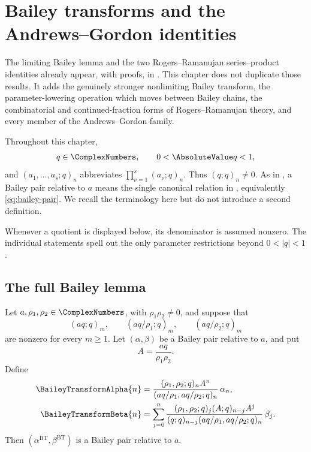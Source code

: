 \chapter{Bailey transforms and the Andrews--Gordon identities}\label{chap:bailey-andrews-gordon}


The limiting Bailey lemma and the two Rogers--Ramanujan series--product
identities already appear, with proofs, in
.  This chapter does not duplicate those results.  It adds
the genuinely stronger nonlimiting Bailey transform, the parameter-lowering
operation which moves between Bailey chains, the combinatorial and
continued-fraction forms of Rogers--Ramanujan theory, and every member of the
Andrews--Gordon family.

Throughout this chapter,
\[
  q\in\ComplexNumbers,\qquad 0<\AbsoluteValue q<1,
\]
and \((a_1,\ldots,a_s;q)_n\) abbreviates
\(\prod_{\nu=1}^{s}(a_\nu;q)_n\).  Thus \((q;q)_n\ne0\).
As in , a Bailey pair relative to \(a\) means the single
canonical relation in , equivalently
\eqref{eq:bailey-pair}.  We recall the terminology here but do not introduce a
second definition.

Whenever a quotient is displayed below, its denominator is assumed nonzero.
The individual statements spell out the only parameter restrictions beyond
\(0<|q|<1\).

\section{The full Bailey lemma}
\label{qg:sec:full-bailey-lemma}

\begin{theorem}
\label{qg:thm-bailey-lemma}
Let \(a,\rho_1,\rho_2\in\ComplexNumbers\), with
\(\rho_1\rho_2\ne0\), and suppose that
\[
  (aq;q)_m,\qquad
  (aq/\rho_1;q)_m,\qquad
  (aq/\rho_2;q)_m
\]
are nonzero for every \(m\ge1\).  Let \((\alpha,\beta)\) be a
Bailey pair relative to \(a\), and put
\[
  A=\frac{aq}{\rho_1\rho_2}.
\]
Define
\begin{align}
 \BaileyTransformAlpha{n}
 &=
 \frac{(\rho_1,\rho_2;q)_n A^n}
      {(aq/\rho_1,aq/\rho_2;q)_n}\,\alpha_n,
 \label{qg:eq:full-bailey-alpha}\\
 \BaileyTransformBeta{n}
 &=
 \sum_{j=0}^{n}
 \frac{(\rho_1,\rho_2;q)_j(A;q)_{n-j}A^j}
      {(q;q)_{n-j}(aq/\rho_1,aq/\rho_2;q)_n}\,\beta_j.
 \label{qg:eq:full-bailey-beta}
\end{align}
Then \((\alpha^{\mathrm{BT}},\beta^{\mathrm{BT}})\) is a Bailey pair relative to
\(a\).
\end{theorem}

